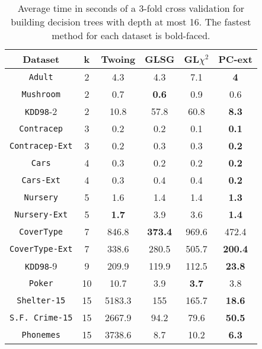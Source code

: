 \begin{table}[]
\small
\caption{Average time in seconds of a 3-fold cross validation
for building decision trees with depth at most 16.
The fastest method for each dataset is bold-faced.}
\centering
\begin{tabular}{c|c|c|c|c|c}
Dataset             & k  & Twoing        & GLSG      & GL$\chi^2$  & PC-ext    \\ \hline
{\tt Adult}         & 2  & 4.3           & 4.3       & 7.1         &{\bf 4}    \\
{\tt Mushroom}      & 2  & 0.7           & {\bf 0.6} & 0.9         & 0.6       \\
{\tt KDD98}-2       & 2  & 10.8          & 57.8      & 60.8        &{\bf 8.3}  \\
{\tt Contracep}     & 3  & 0.2           & 0.2       & 0.1         &{\bf 0.1}  \\
{\tt Contracep-Ext} & 3  & 0.2           & 0.3       & 0.3         &{\bf 0.2}  \\
{\tt Cars}          & 4  & 0.3           & 0.2       & 0.2         &{\bf 0.2}  \\
{\tt Cars-Ext}      & 4  & 0.3           & 0.4       & 0.4         &{\bf 0.2}  \\
{\tt Nursery}       & 5  & 1.6           & 1.4       & 1.4         &{\bf 1.3}  \\
{\tt Nursery-Ext}   & 5  & {\bf 1.7}     & 3.9       & 3.6         &{\bf 1.4}  \\
{\tt CoverType}     & 7  & 846.8         &{\bf 373.4}& 969.6       & 472.4     \\
{\tt CoverType-Ext} & 7  & 338.6         & 280.5     & 505.7       &{\bf 200.4}\\
{\tt KDD98}-9       & 9  & 209.9         & 119.9     & 112.5       &{\bf 23.8} \\
{\tt Poker}         & 10 & 10.7          & 3.9       & {\bf 3.7}   & 3.8       \\ 
{\tt Shelter-15}    & 15 & 5183.3        & 155       & 165.7       &{\bf 18.6} \\   
{\tt S.F. Crime-15} & 15 & 2667.9        & 94.2      & 79.6        &{\bf 50.5} \\ 
{\tt Phonemes}      & 15 & 3738.6        & 8.7       & 10.2        &{\bf 6.3}
\end{tabular}
\label{tab:time}
\end{table}


